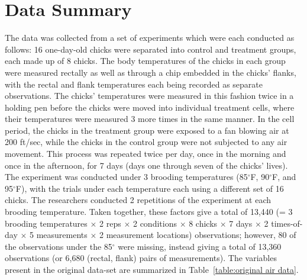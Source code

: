 \documentclass[a4paper, 10pt, titlepage]{article}
\begin{document}
\section{Data Summary}
The data was collected from a set of experiments which were each conducted as follows:  16 one-day-old chicks were separated into control and treatment groups, each made up of 8 chicks. The body temperatures of the chicks in each group were measured rectally as well as through a chip embedded in the chicks’ flanks, with the rectal and flank temperatures each being recorded as separate observations. The chicks’ temperatures were measured in this fashion twice in a holding pen before the chicks were moved into individual treatment cells, where their temperatures were measured 3 more times in the same manner. In the cell period, the chicks in the treatment group were exposed to a fan blowing air at 200 ft/sec, while the chicks in the control group were not subjected to any air movement. This process was repeated twice per day, once in the morning and once in the afternoon, for 7 days (days one through seven of the chicks' lives). The experiment was conducted under 3 brooding temperatures (85$^{\circ}$F, 90$^{\circ}$F, and 95$^{\circ}$F), with the trials under each temperature each using a different set of 16 chicks. The researchers conducted 2 repetitions of the experiment at each brooding temperature. Taken together, these factors give a total of 13,440 (= 3 brooding temperatures $\times$ 2 reps $\times$ 2 conditions $\times$ 8 chicks $\times$ 7 days $\times$ 2 times-of-day $\times$ 5 measurements $\times$ 2 measurement locations) observations; however, 80 of the observations under the 85$^{\circ}$ were missing, instead giving a total of 13,360 observations (or 6,680 (rectal, flank) pairs of measurements). The variables present in the original data-set are summarized in Table~\ref{table:original air data}.
\end{document}
